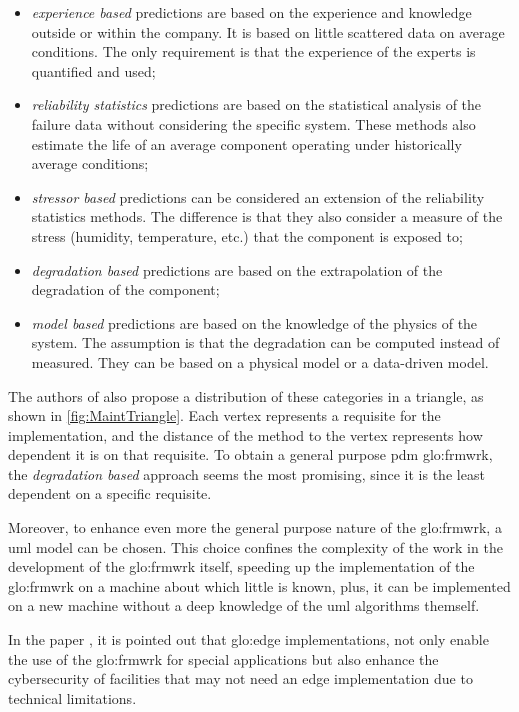 \begin{itemize}
    \item \emph{experience based} predictions are based on the experience and knowledge outside or within the company. It is based on little scattered data on average conditions. The only  requirement is that the experience of the experts is quantified and used;
    \item \emph{reliability statistics} predictions are based on the statistical analysis of the failure data without considering the specific system. These methods also estimate the life
    of an average component operating under historically average conditions;
    \item \emph{stressor based} predictions can be considered an extension of the reliability statistics methods. The difference is that they also consider a measure of the stress (humidity, temperature, etc.) that the component is exposed to;
    \item \emph{degradation based} predictions are based on the extrapolation of the degradation of the component;
    \item \emph{model based} predictions are based on the knowledge of the physics of the system. The assumption is that the degradation can be computed instead of measured. They can be based on a physical model or a data-driven model.
\end{itemize}


The authors of \cite{Maintenance_cat} also propose a distribution of these categories in a triangle, as shown in \autoref{fig:MaintTriangle}. Each vertex represents a requisite for the implementation, and the distance of the method to the vertex represents how dependent it is on that requisite. To obtain a general purpose \gls{pdm} \gls{glo:frmwrk}, the \emph{degradation based} approach seems the most promising, since it is the least dependent on a specific requisite.

Moreover, to enhance even more the general purpose nature of the \gls{glo:frmwrk}, a \gls{uml} model can be chosen. This choice confines the complexity of the work in the development of the \gls{glo:frmwrk} itself, speeding up the implementation of the \gls{glo:frmwrk} on a machine about which little is known, plus, it can be implemented on a new machine without a deep knowledge of the \gls{uml} algorithms themself.

In the paper \cite{GridPredictMaintenance}, it is pointed out that \gls{glo:edge} implementations, not only enable the use of the \gls{glo:frmwrk} for special applications but also enhance the cybersecurity of facilities that may not need an edge implementation due to technical limitations.